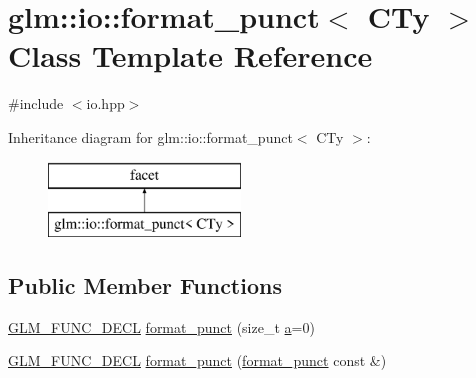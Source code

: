 \hypertarget{classglm_1_1io_1_1format__punct}{}\section{glm\+::io\+::format\+\_\+punct$<$ C\+Ty $>$ Class Template Reference}
\label{classglm_1_1io_1_1format__punct}


{\ttfamily \#include $<$io.\+hpp$>$}

Inheritance diagram for glm\+::io\+::format\+\_\+punct$<$ C\+Ty $>$\+:\begin{figure}[H]
\begin{center}
\leavevmode
\includegraphics[height=2.000000cm]{classglm_1_1io_1_1format__punct}
\end{center}
\end{figure}
\subsection*{Public Member Functions}
\begin{DoxyCompactItemize}
\item 
\mbox{\hyperlink{setup_8hpp_ab2d052de21a70539923e9bcbf6e83a51}{G\+L\+M\+\_\+\+F\+U\+N\+C\+\_\+\+D\+E\+CL}} \mbox{\hyperlink{classglm_1_1io_1_1format__punct_ae56e7a14fac2516658837281b9da4659}{format\+\_\+punct}} (size\+\_\+t \mbox{\hyperlink{glad_8h_ac8729153468b5dcf13f971b21d84d4e5}{a}}=0)
\item 
\mbox{\hyperlink{setup_8hpp_ab2d052de21a70539923e9bcbf6e83a51}{G\+L\+M\+\_\+\+F\+U\+N\+C\+\_\+\+D\+E\+CL}} \mbox{\hyperlink{classglm_1_1io_1_1format__punct_a89a8c3cfb0b975f3dd8c0416101c59b7}{format\+\_\+punct}} (\mbox{\hyperlink{classglm_1_1io_1_1format__punct}{format\+\_\+punct}} const \&)
\end{DoxyCompactItemize}
